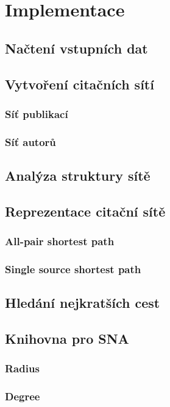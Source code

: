 \documentclass[12pt,titlepage]{report}
\begin{document}
\chapter{Implementace}
\section{Načtení vstupních dat}

\section{Vytvoření citačních sítí}
\subsection{Síť publikací}
\subsection{Síť autorů}

\section{Analýza struktury sítě}

\section{Reprezentace citační sítě}
\subsection{All-pair shortest path}
\subsection{Single source shortest path}

\section{Hledání nejkratších cest}

\section{Knihovna pro SNA}
\subsection{Radius}
\subsection{Degree}
\end{document}
